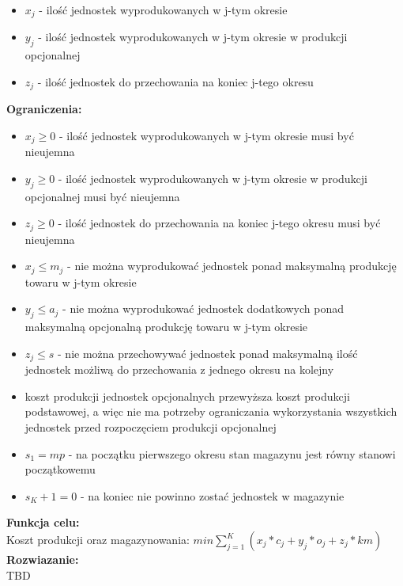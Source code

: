 \documentclass[15pt, a4paper]{article}
\begin{document}
\begin{itemize}
    \item \( x_j \) - ilość jednostek wyprodukowanych w j-tym okresie
    \item \( y_j \) - ilość jednostek wyprodukowanych w j-tym okresie w produkcji opcjonalnej
    \item \( z_j \) - ilość jednostek do przechowania na koniec j-tego okresu
\end{itemize}

\noindent\textbf{Ograniczenia:}

\begin{itemize}
    \item \(x_{j} \geq 0 \) - ilość jednostek wyprodukowanych w j-tym okresie musi być nieujemna
    \item \(y_{j} \geq 0 \) - ilość jednostek wyprodukowanych w j-tym okresie w produkcji opcjonalnej musi być nieujemna
    \item \(z_{j} \geq 0 \) - ilość jednostek do przechowania na koniec j-tego okresu musi być nieujemna
    \item \( x_{j} \leq m_j \) - nie można wyprodukować jednostek ponad maksymalną produkcję towaru w j-tym okresie     
    \item \( y_{j} \leq a_j\) - nie można wyprodukować jednostek dodatkowych ponad maksymalną opcjonalną produkcję towaru w j-tym okresie     
    \item \( z_j \leq s \) - nie można przechowywać jednostek ponad maksymalną ilość jednostek możliwą do przechowania z jednego okresu na kolejny
    \item koszt produkcji jednostek opcjonalnych przewyższa koszt produkcji podstawowej, a więc nie ma potrzeby ograniczania wykorzystania wszystkich jednostek przed rozpoczęciem produkcji opcjonalnej
    \item \( s_1 = mp \) - na początku pierwszego okresu stan magazynu jest równy stanowi początkowemu 
    \item \( s_K+1 = 0 \) - na koniec nie powinno zostać jednostek w magazynie
\end{itemize}

\noindent\textbf{Funkcja celu:}\\

Koszt produkcji oraz magazynowania: \(min \sum_{j=1}^{K}(x_{j} * c_{j} + y_{j} * o_{j} + z_{j} * km)\)\\

\noindent\textbf{Rozwiazanie:}\\ 

TBD
\end{document}
